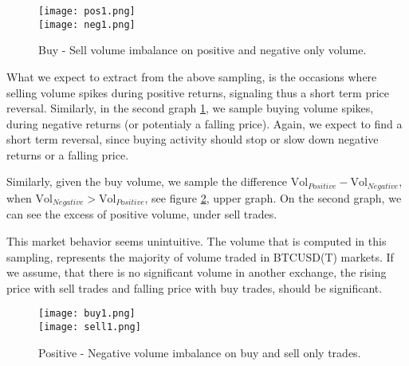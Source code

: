 \begin{figure}[H]
	\centering
    \texttt{[image: pos1.png]} \\
    \texttt{[image: neg1.png]}
	\caption{Buy - Sell volume imbalance on positive and negative only volume.}
    \label{fig:pos_neg}
\end{figure}

What we expect to extract from the above sampling, is the occasions where selling volume spikes during positive returns, signaling thus a short term price reversal. Similarly, in the second graph \ref{fig:pos_neg}, we sample buying volume spikes, during negative returns (or potentialy a falling price). Again, we expect to find a short term reversal, since buying activity should stop or slow down negative returns or a falling price.

Similarly, given the buy volume, we sample the difference  \(\text{Vol}_{Positive} - \text{Vol}_{Negative} \), when \(\text{Vol}_{Negative} > \text{Vol}_{Positive} \), see figure \ref{fig:buy_sell}, upper graph. On the second graph, we can see the excess of positive volume, under sell trades.

This market behavior seems unintuitive. The volume that is computed in this sampling, represents the majority of volume traded in BTCUSD(T) markets. If we assume, that there is no significant volume in another exchange, the rising price with sell trades and falling price with buy trades, should be significant.

\begin{figure}[H]
	\centering
    \texttt{[image: buy1.png]} \\
    \texttt{[image: sell1.png]}
	\caption{Positive - Negative volume imbalance on buy and sell only trades.}
    \label{fig:buy_sell}
\end{figure}
